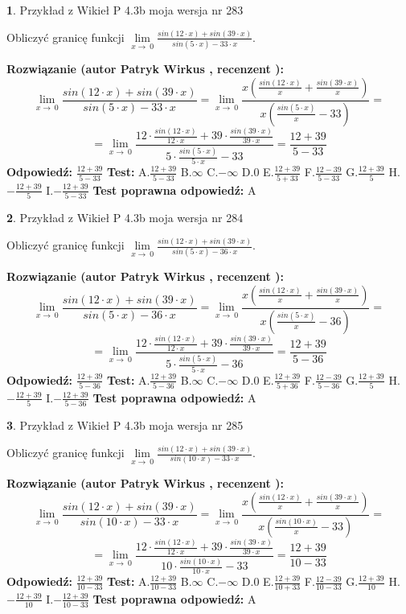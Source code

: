 \documentclass[12pt, a4paper]{article}
\theoremstyle{definition} %
\newtheorem{zad}{}
\newcommand{\zadStart}[1]{\begin{zad}#1\newline}
\newcommand{\zadStop}{\end{zad}}
\newcommand{\rozwStart}[2]{\noindent \textbf{Rozwiązanie (autor #1 , recenzent #2): }\newline}
\newcommand{\rozwStop}{\newline}
\newcommand{\odpStart}{\noindent \textbf{Odpowiedź:}\newline}
\newcommand{\odpStop}{\newline}
\newcommand{\testStart}{\noindent \textbf{Test:}\newline}
\newcommand{\testStop}{\newline}
\newcommand{\kluczStart}{\noindent \textbf{Test poprawna odpowiedź:}\newline}
\newcommand{\kluczStop}{\newline}
\begin{document}
\zadStart{Przykład z Wikieł P 4.3b moja wersja nr 283}


Obliczyć granicę funkcji $\lim\limits_{x\to\ 0}\frac{sin(12 \cdot x)+sin(39 \cdot x)}{sin(5 \cdot x)-33 \cdot x}$.
\zadStop
\rozwStart{Patryk Wirkus}{}
$$\lim\limits_{x\to\ 0}\frac{sin(12 \cdot x)+sin(39 \cdot x)}{sin(5 \cdot x)-33 \cdot x}=\lim\limits_{x\to\ 0}\frac{x(\frac{sin(12 \cdot x)}{x}+\frac{sin(39 \cdot x)}{x})}{x(\frac{sin(5 \cdot x)}{x}-33)}=$$
$$=\lim\limits_{x\to\ 0}\frac{12 \cdot \frac{sin(12 \cdot x)}{12 \cdot x}+39 \cdot \frac{sin(39 \cdot x)}{39 \cdot x}}{5 \cdot \frac{sin(5 \cdot x)}{5 \cdot x}-33}=\frac{12+39}{5-33}$$
\rozwStop
\odpStart
$\frac{12+39}{5-33}$
\odpStop
\testStart
A.$\frac{12+39}{5-33}$
B.$\infty$
C.$-\infty$
D.$0$
E.$\frac{12+39}{5+33}$
F.$\frac{12-39}{5-33}$
G.$\frac{12+39}{5}$
H.$-\frac{12+39}{5}$
I.$-\frac{12+39}{5-33}$
\testStop
\kluczStart
A
\kluczStop



\zadStart{Przykład z Wikieł P 4.3b moja wersja nr 284}


Obliczyć granicę funkcji $\lim\limits_{x\to\ 0}\frac{sin(12 \cdot x)+sin(39 \cdot x)}{sin(5 \cdot x)-36 \cdot x}$.
\zadStop
\rozwStart{Patryk Wirkus}{}
$$\lim\limits_{x\to\ 0}\frac{sin(12 \cdot x)+sin(39 \cdot x)}{sin(5 \cdot x)-36 \cdot x}=\lim\limits_{x\to\ 0}\frac{x(\frac{sin(12 \cdot x)}{x}+\frac{sin(39 \cdot x)}{x})}{x(\frac{sin(5 \cdot x)}{x}-36)}=$$
$$=\lim\limits_{x\to\ 0}\frac{12 \cdot \frac{sin(12 \cdot x)}{12 \cdot x}+39 \cdot \frac{sin(39 \cdot x)}{39 \cdot x}}{5 \cdot \frac{sin(5 \cdot x)}{5 \cdot x}-36}=\frac{12+39}{5-36}$$
\rozwStop
\odpStart
$\frac{12+39}{5-36}$
\odpStop
\testStart
A.$\frac{12+39}{5-36}$
B.$\infty$
C.$-\infty$
D.$0$
E.$\frac{12+39}{5+36}$
F.$\frac{12-39}{5-36}$
G.$\frac{12+39}{5}$
H.$-\frac{12+39}{5}$
I.$-\frac{12+39}{5-36}$
\testStop
\kluczStart
A
\kluczStop



\zadStart{Przykład z Wikieł P 4.3b moja wersja nr 285}


Obliczyć granicę funkcji $\lim\limits_{x\to\ 0}\frac{sin(12 \cdot x)+sin(39 \cdot x)}{sin(10 \cdot x)-33 \cdot x}$.
\zadStop
\rozwStart{Patryk Wirkus}{}
$$\lim\limits_{x\to\ 0}\frac{sin(12 \cdot x)+sin(39 \cdot x)}{sin(10 \cdot x)-33 \cdot x}=\lim\limits_{x\to\ 0}\frac{x(\frac{sin(12 \cdot x)}{x}+\frac{sin(39 \cdot x)}{x})}{x(\frac{sin(10 \cdot x)}{x}-33)}=$$
$$=\lim\limits_{x\to\ 0}\frac{12 \cdot \frac{sin(12 \cdot x)}{12 \cdot x}+39 \cdot \frac{sin(39 \cdot x)}{39 \cdot x}}{10 \cdot \frac{sin(10 \cdot x)}{10 \cdot x}-33}=\frac{12+39}{10-33}$$
\rozwStop
\odpStart
$\frac{12+39}{10-33}$
\odpStop
\testStart
A.$\frac{12+39}{10-33}$
B.$\infty$
C.$-\infty$
D.$0$
E.$\frac{12+39}{10+33}$
F.$\frac{12-39}{10-33}$
G.$\frac{12+39}{10}$
H.$-\frac{12+39}{10}$
I.$-\frac{12+39}{10-33}$
\testStop
\kluczStart
A
\kluczStop
\end{document}
